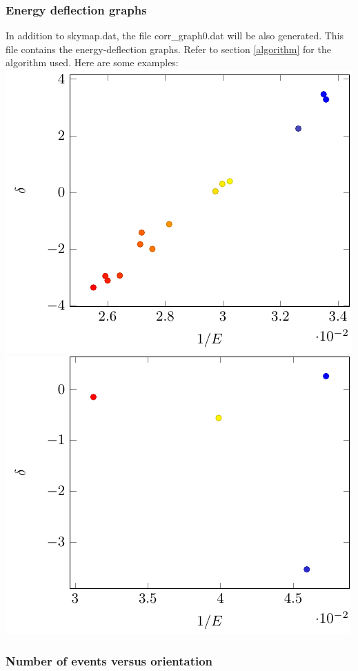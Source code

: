 \documentclass[12pt]{article}
\begin{document}
\subsubsection{Energy deflection graphs}
In addition to skymap.dat, the file corr\_graph0.dat will be also generated.
This file contains the energy-deflection graphs. Refer to section
\ref{algorithm} for the algorithm used. Here are some examples:\\
\includegraphics[scale=0.8]{corr_graph.pdf} 
\includegraphics[scale=0.8]{corr_graph-sim.pdf} \hfill

\subsubsection{Number of events versus orientation}
\end{document}
